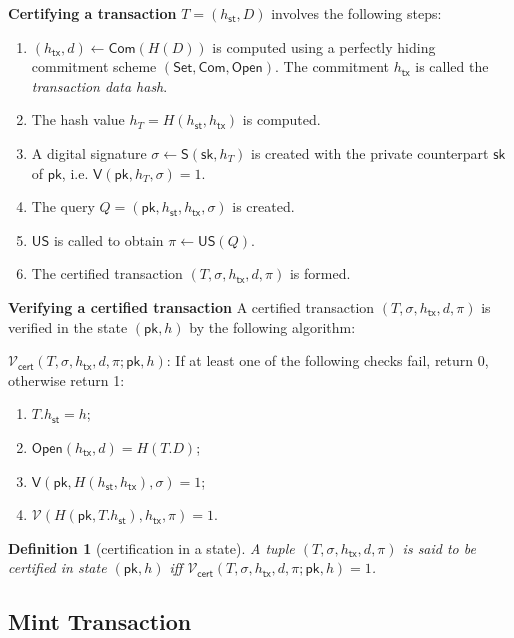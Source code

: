 \documentclass{article}
\newtheorem{definition}{Definition}[section]
\newcommand{\sig}[0]{\mathsf{S}}
\newcommand{\sigver}[0]{\mathsf{V}}
\newcommand{\pubkey}[0]{\mathsf{pk}}
\newcommand{\prikey}[0]{\mathsf{sk}}
\newcommand{\setup}[0]{\mathsf{Set}}
\newcommand{\commit}[0]{\mathsf{Com}}
\newcommand{\open}[0]{\mathsf{Open}}
\newcommand{\unisrv}[0]{\mathsf{US}}
\newcommand{\sthash}[0]{h_\mathsf{st}}
\newcommand{\txhash}[0]{h_\mathsf{tx}}
\newcommand{\univer}[0]{\mathcal{V}}
\newcommand{\certver}[0]{\mathcal{V}_\mathsf{cert}}
\begin{document}
\noindent\textbf{Certifying a transaction} $T = (\sthash, D)$ involves the following steps:
\begin{enumerate}
\item $(\txhash,d) \gets \commit(H(D))$ is computed using a perfectly hiding commitment scheme $(\setup,\commit,\open)$.
The commitment $\txhash$ is called the \emph{transaction data hash}.
\item The hash value $h_T = H(\sthash, \txhash)$ is computed.
\item A digital signature $\sigma \gets \sig(\prikey, h_T)$ is created with the private counterpart $\prikey$ of $\pubkey$, i.e. $\mathsf{V}(\pubkey, h_T, \sigma) = 1$.
\item The query $Q = (\pubkey,\sthash,\txhash,\sigma)$ is created.
\item $\unisrv$ is called to obtain $\pi\gets \unisrv(Q)$.
\item The certified transaction $(T,\sigma,\txhash,d,\pi)$ is formed.
\end{enumerate}

\noindent\textbf{Verifying a certified transaction} A certified transaction $(T,\sigma,\txhash,d,\pi)$ is verified in the state $(\pubkey,h)$ by the following algorithm:\medskip

\noindent $\certver(T,\sigma,\txhash,d,\pi;\pubkey,h)$:
If at least one of the following checks fail, return 0, otherwise return 1:
\begin{enumerate}
\item $T.\sthash=h$;
\item $\open(\txhash,d)=H(T.D)$;
\item $\sigver(\pubkey, H(\sthash,\txhash),\sigma)=1$;
\item $\univer(H(\pubkey,T.\sthash),\txhash,\pi)=1$.
\end{enumerate}

\begin{definition}[certification in a state]\label{de:certstate}
A tuple $(T,\sigma,\txhash,d,\pi)$ is said to be \emph{certified in state} $(\pubkey,h)$ iff $\certver(T,\sigma,\txhash,d,\pi;\pubkey,h)=1$.
\end{definition}


\subsection{Mint Transaction}
\end{document}
